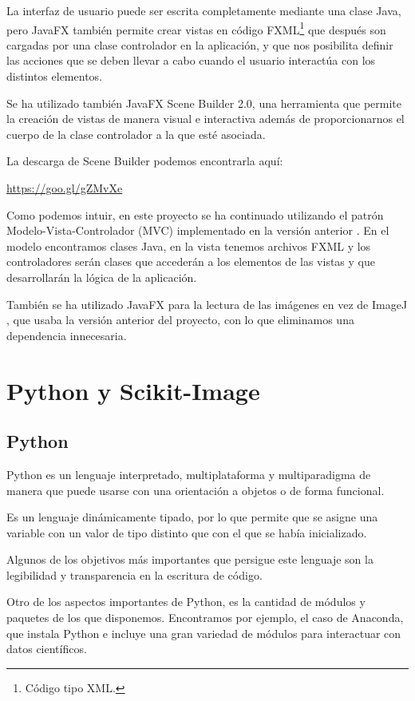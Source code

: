 La interfaz de usuario puede ser escrita completamente mediante una clase Java, pero JavaFX también permite crear vistas en código FXML\footnote{Código tipo XML.} que después son cargadas por una clase controlador en la aplicación, y que nos posibilita definir las acciones que se deben llevar a cabo cuando el usuario interactúa con los distintos elementos.

Se ha utilizado también JavaFX Scene Builder 2.0, una herramienta que permite la creación de vistas de manera visual e interactiva además de proporcionarnos el cuerpo de la clase controlador a la que esté asociada.

La descarga de Scene Builder podemos encontrarla aquí: 

\url{https://goo.gl/gZMvXe}

Como podemos intuir, en este proyecto se ha continuado utilizando el patrón Modelo-Vista-Controlador (MVC) implementado en la versión anterior \cite{perikymataV1}. En el modelo encontramos clases Java, en la vista tenemos archivos FXML y los controladores serán clases que accederán a los elementos de las vistas y que desarrollarán la lógica de la aplicación.

También se ha utilizado JavaFX para la lectura de las imágenes en vez de ImageJ \cite{ImageJ}, que usaba la versión anterior del proyecto, con lo que eliminamos una dependencia innecesaria.

\section{Python y Scikit-Image}
\label{th:PythonYSkimage}
\subsection{Python} \label{th:Python}
Python \cite{wiki:Python} es un lenguaje interpretado, multiplataforma y multiparadigma de manera que puede usarse con una orientación a objetos o de forma funcional. 

Es un lenguaje dinámicamente tipado, por lo que permite que se asigne una variable con un valor de tipo distinto que con el que se había inicializado.

Algunos de los objetivos más importantes que persigue este lenguaje son la legibilidad y transparencia en la escritura de código. 

Otro de los aspectos importantes de Python, es la cantidad de módulos y paquetes de los que disponemos. Encontramos por ejemplo, el caso de Anaconda, que instala Python e incluye una gran variedad de módulos para interactuar con datos científicos.


